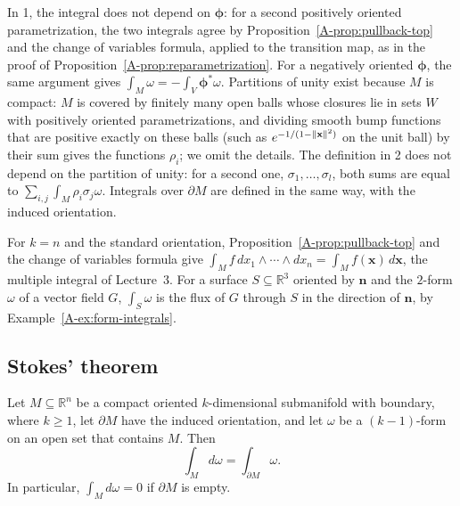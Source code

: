 In 1, the integral does not depend on $\boldsymbol{\phi}$: for a second positively oriented parametrization, the two integrals agree by Proposition~\ref{A-prop:pullback-top} and the change of variables formula, applied to the transition map, as in the proof of Proposition~\ref{A-prop:reparametrization}. For a negatively oriented $\boldsymbol{\phi}$, the same argument gives $\int_M \omega = -\int_V \boldsymbol{\phi}^*\omega$. Partitions of unity exist because $M$ is compact: $M$ is covered by finitely many open balls whose closures lie in sets $W$ with positively oriented parametrizations, and dividing smooth bump functions that are positive exactly on these balls (such as $e^{-1/(1 - \lVert \mathbf{x} \rVert^2)}$ on the unit ball) by their sum gives the functions $\rho_i$; we omit the details. The definition in 2 does not depend on the partition of unity: for a second one, $\sigma_1, \ldots, \sigma_l$, both sums are equal to $\sum_{i, j} \int_M \rho_i\sigma_j\omega$. Integrals over $\partial M$ are defined in the same way, with the induced orientation.

For $k = n$ and the standard orientation, Proposition~\ref{A-prop:pullback-top} and the change of variables formula give $\int_M f\, dx_1 \wedge \cdots \wedge dx_n = \int_M f(\mathbf{x})\, d\mathbf{x}$, the multiple integral of Lecture~3. For a surface $S \subseteq \mathbb{R}^3$ oriented by $\mathbf{n}$ and the $2$-form $\omega$ of a vector field $G$, $\int_S \omega$ is the flux of $G$ through $S$ in the direction of $\mathbf{n}$, by Example~\ref{A-ex:form-integrals}.

\subsection{Stokes' theorem}

\begin{theorem}[Stokes]\label{A-thm:stokes}
    Let $M \subseteq \mathbb{R}^n$ be a compact oriented $k$-dimensional submanifold with boundary, where $k \geq 1$, let $\partial M$ have the induced orientation, and let $\omega$ be a $(k - 1)$-form on an open set that contains $M$. Then
    \[\int_M d\omega = \int_{\partial M} \omega.\]
    In particular, $\int_M d\omega = 0$ if $\partial M$ is empty.
\end{theorem}

